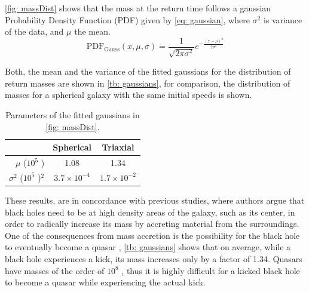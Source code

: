 	\autoref{fig: massDist} shows that the mass at the return time follows a gaussian Probability Density Function (PDF) given by \autoref{eq: gaussian}, where $\sigma^2$ is variance of the data, and $\mu$ the mean.
	\begin{equation}\label{eq: gaussian}
		\text{PDF}_\text{Gauss}(x, \mu, \sigma) = \dfrac{1}{\sqrt{2\pi\sigma^2}}e^{-\frac{(x - \mu)^2}{2\sigma^2}}
	\end{equation}
	
	Both, the mean and the variance of the fitted gaussians for the distribution of return masses are shown in \autoref{tb: gaussians}, for comparison, the distribution of masses for a spherical galaxy with the same initial speeds is shown.
	\begin{table}[h]
		\centering
		\caption{Parameters of the fitted gaussians in \autoref{fig: massDist}.}
		\begin{tabular}{r|cc}
			\hline
			& \textbf{Spherical} & \textbf{Triaxial} \\
			\hline
			$\mu$ ($10^5$ \sm)& 1.08 & 1.34 \\
			$\sigma^2$ ($10^5$ \sm)$^2$& $3.7\times10^{-4}$ & $1.7\times10^{-2}$\\
			\hline
		\end{tabular}
		\label{tb: gaussians}
	\end{table}

	These results, are in concordance with previous studies, where authors argue that black holes need to be at high density areas of the galaxy, such as its center, in order to radically increase its mass by accreting material from the surroundings. One of the consequences from mass accretion is the possibility for the black hole to eventually become a quasar \cite{tanaka2009assembly}, \autoref{tb: gaussians} shows that on average, while a black hole experiences a kick, its mass increases only by a factor of 1.34. Quasars have masses of the order of $10^8$ \sm, thus it is highly difficult for a kicked black hole to become a quasar while experiencing the actual kick.
	
